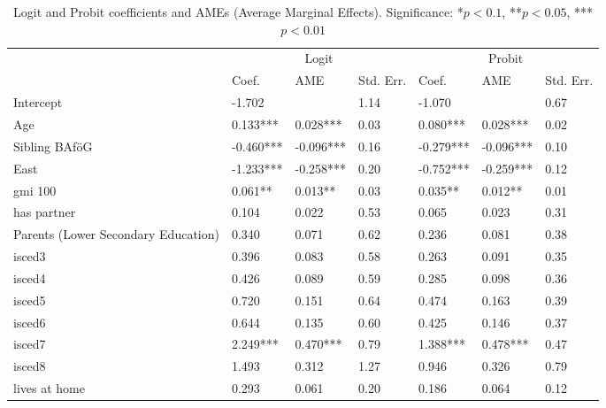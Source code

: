 \begin{table}[htbp]
\centering
\footnotesize
\caption{Logit and Probit coefficients and AMEs (Average Marginal Effects). Significance: *\( p < 0.1 \), **\( p < 0.05 \), ***\( p < 0.01 \)}
\label{tab:logit-probit-ame}
\begin{tabular}{lllllll}
\toprule
             & \multicolumn{3}{c}{Logit}           & \multicolumn{3}{c}{Probit} \\
\cmidrule(lr){2-4} \cmidrule(lr){5-7}
             & Coef.    & AME      & Std. Err.   & Coef.    & AME      & Std. Err. \\
\midrule
Intercept                           & -1.702    &            & 1.14     & -1.070    &            & 0.67     \\
Age                                 & 0.133***  & 0.028***   & 0.03     & 0.080***  & 0.028***   & 0.02     \\
Sibling BAföG                       & -0.460*** & -0.096***  & 0.16     & -0.279*** & -0.096***  & 0.10     \\
East                                & -1.233*** & -0.258***  & 0.20     & -0.752*** & -0.259***  & 0.12     \\
gmi 100                             & 0.061**   & 0.013**    & 0.03     & 0.035**   & 0.012**    & 0.01     \\
has partner                         & 0.104     & 0.022      & 0.53     & 0.065     & 0.023      & 0.31     \\
Parents (Lower Secondary Education) & 0.340     & 0.071      & 0.62     & 0.236     & 0.081      & 0.38     \\
isced3                              & 0.396     & 0.083      & 0.58     & 0.263     & 0.091      & 0.35     \\
isced4                              & 0.426     & 0.089      & 0.59     & 0.285     & 0.098      & 0.36     \\
isced5                              & 0.720     & 0.151      & 0.64     & 0.474     & 0.163      & 0.39     \\
isced6                              & 0.644     & 0.135      & 0.60     & 0.425     & 0.146      & 0.37     \\
isced7                              & 2.249***  & 0.470***   & 0.79     & 1.388***  & 0.478***   & 0.47     \\
isced8                              & 1.493     & 0.312      & 1.27     & 0.946     & 0.326      & 0.79     \\
lives at home                       & 0.293     & 0.061      & 0.20     & 0.186     & 0.064      & 0.12     \\

\end{tabular}
\end{table}
